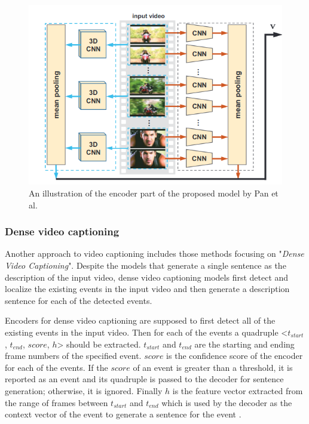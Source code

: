 \documentclass[preprint, 12pt]{elsarticle}
\begin{document}
		\begin{figure}[h]
			\centering
			\includegraphics[scale=0.5]{Imgs/3DCNN2.png}
			\caption{An illustration of the encoder part of the proposed model by Pan et al. \cite{pan2016jointly}}
			\label{fig:3dcnn2}
		\end{figure}
	
		\subsubsection{Dense video captioning}
		Another approach to video captioning includes those methods focusing on "\textit{Dense Video Captioning}". Despite the models that generate a single sentence as the description of the input video, dense video captioning models first detect and localize the existing events in the input video and then generate a description sentence for each of the detected events. 
		
		Encoders for dense video captioning are supposed to first detect all of the existing events in the input video. Then for each of the events a quadruple <$t_{start}$, $t_{end}$, $score$, $h$> should be extracted. $t_{start}$ and $t_{end}$ are the starting and ending frame numbers of the specified event. $score$ is the confidence score of the encoder for each of the events. If the $score$ of an event is greater than a threshold, it is reported as an event and its quadruple is passed to the decoder for sentence generation; otherwise, it is ignored. Finally $h$ is the feature vector extracted from the range of frames between $t_{start}$ and $t_{end}$ which is used by the decoder as the context vector of the event to generate a sentence for the event \cite{li2018jointly}. 
		
\end{document}

